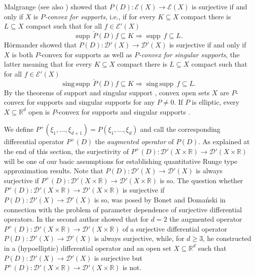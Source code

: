 \documentclass[12pt]{amsart}
\newcommand{\R}{\mathbb{R}}
\newcommand{\supp}{\operatorname{supp}\,}
\newcommand{\singsupp}{\operatorname{sing\,supp}\,}
\theoremstyle{definition}
\theoremstyle{remark}
\numberwithin{equation}{section}
\begin{document}
Malgrange \cite{Malgrange} (see also \cite[Section 10.6]{HoermanderPDO2}) showed  that $P(D): \mathscr{E}(X) \to\mathscr{E}(X)$ is surjective  if and only if $X$ is \emph{$P$-convex for supports}, i.e., if for every $K \subseteq X$ compact there is $L \subseteq X$ compact  such that for all $f\in\mathscr{E}'(X)$
$$\supp\check{P}(D)f \subseteq K\Longrightarrow\supp f \subseteq L.$$ 
H\"ormander \cite[Section 10.7]{HoermanderPDO2} showed that $P(D): \mathscr{D}'(X) \to \mathscr{D}'(X)$ is surjective if and only if $X$ is both $P$-convex for supports as well as \emph{$P$-convex for singular supports}, the latter meaning that for every $K \subseteq X$ compact there is $L \subseteq X$ compact  such that for all $f\in\mathscr{E}'(X)$
$$\singsupp\check{P}(D)f \subseteq K\Longrightarrow\singsupp f \subseteq L.$$ 
By the theorems of support and singular support \cite[Theorem 7.3.2 and Theorem 7.3.9]{HoermanderPDO1}, convex open sets $X$ are  $P$-convex for supports and singular supports for any $P\neq 0$. If $P$ is elliptic,  every $X \subseteq \R^d$ open is $P$-convex for supports and singular supports \cite[Corollary 10.8.2 and Theorem 11.1.1]{HoermanderPDO2}.

We define $P^+(\xi_1,\ldots,\xi_{d+1})=P(\xi_1,\ldots,\xi_d)$ and call the corresponding differential operator $P^+(D)$  the \emph{augmented operator} of $P(D)$. As explained at the end of this section, the surjectivity of $P^+(D): \mathscr{D}'(X\times\R) \to \mathscr{D}'(X\times\R)$ will be one of our basic assumptions for establishing  quantitative Runge type approximation results. Note that $P(D): \mathscr{D}'(X) \to \mathscr{D}'(X)$ is always surjective if $P^+(D): \mathscr{D}'(X\times\R) \to \mathscr{D}'(X\times\R)$ is so. The question whether  $P^+(D): \mathscr{D}'(X\times\R) \to \mathscr{D}'(X\times\R)$ is surjective if $P(D): \mathscr{D}'(X) \to \mathscr{D}'(X)$ is so, was posed by Bonet and Doma\'nski \cite[Proposition 8.1]{B-D2006} in connection with the problem of parameter dependence of surjective differential operators. In \cite{Kalmes12-3}  the second author showed that for $d=2$ the augmented operator $P^+(D): \mathscr{D}'(X\times\R) \to \mathscr{D}'(X\times\R)$   of a surjective  differential operator $P(D): \mathscr{D}'(X) \to \mathscr{D}'(X)$   is always surjective, while, for $d \geq 3$,  he constructed in \cite{Kalmes12-2} a (hypoelliptic) differential operator and an open set $X \subseteq \R^d$ such that $P(D): \mathscr{D}'(X) \to \mathscr{D}'(X)$  is surjective but $P^+(D): \mathscr{D}'(X\times\R) \to \mathscr{D}'(X\times\R)$  is not. 
 
\end{document}
